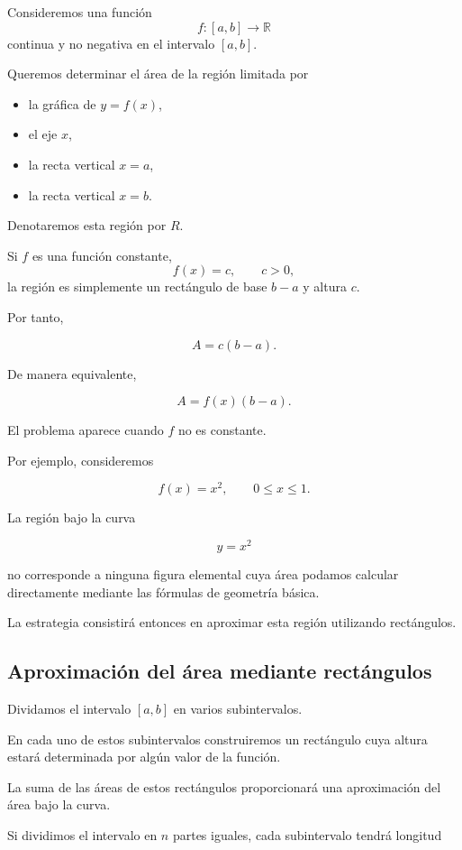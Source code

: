 \documentclass[12pt]{article}
\begin{document}
Consideremos una función
\[
f:[a,b]\longrightarrow\mathbb{R}
\]
continua y no negativa en el intervalo $[a,b]$.

Queremos determinar el área de la región limitada por

\begin{itemize}
    \item la gráfica de $y=f(x)$,
    \item el eje $x$,
    \item la recta vertical $x=a$,
    \item la recta vertical $x=b$.
\end{itemize}

Denotaremos esta región por $R$.

Si $f$ es una función constante,
\[
f(x)=c,
\qquad c>0,
\]
la región es simplemente un rectángulo de base $b-a$ y altura $c$.

Por tanto,

\[
A=c(b-a).
\]

De manera equivalente,

\[
A=f(x)(b-a).
\]

El problema aparece cuando $f$ no es constante.

Por ejemplo, consideremos

\[
f(x)=x^2,
\qquad 0\leq x\leq1.
\]

La región bajo la curva

\[
y=x^2
\]

no corresponde a ninguna figura elemental cuya área podamos calcular
directamente mediante las fórmulas de geometría básica.

La estrategia consistirá entonces en aproximar esta región utilizando
rectángulos.

\subsection{Aproximación del área mediante rectángulos}

Dividamos el intervalo $[a,b]$ en varios subintervalos.

En cada uno de estos subintervalos construiremos un rectángulo cuya altura
estará determinada por algún valor de la función.

La suma de las áreas de estos rectángulos proporcionará una aproximación
del área bajo la curva.

Si dividimos el intervalo en $n$ partes iguales, cada subintervalo tendrá
longitud
\end{document}
